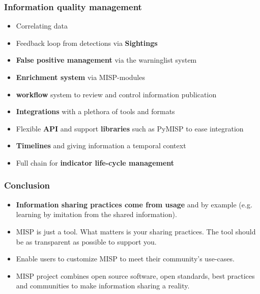 \begin{frame}
\frametitle{Information quality management}
    \begin{itemize}
        \item Correlating data
        \item Feedback loop from detections via {\bf Sightings}
        \item {\bf False positive management} via the warninglist system
        \item {\bf Enrichment system} via MISP-modules
        \item {\bf workflow} system to review and control information publication
        \item {\bf Integrations} with a plethora of tools and formats
        \item Flexible {\bf API} and support {\bf libraries} such as PyMISP to ease integration
        \item {\bf Timelines} and giving information a temporal context
        \item Full chain for {\bf indicator life-cycle management}
    \end{itemize}
\end{frame}

\begin{frame}
        \frametitle{Conclusion}
        \begin{itemize}
                \item {\bf Information sharing practices come from usage} and by example (e.g. learning by imitation from the shared information).
                \item MISP is just a tool. What matters is your sharing practices. The tool should be as transparent as possible to support you.
                \item Enable users to customize MISP to meet their community's use-cases.
                \item MISP project combines open source software, open standards, best practices and communities to make information sharing a reality.
        \end{itemize}
\end{frame}
